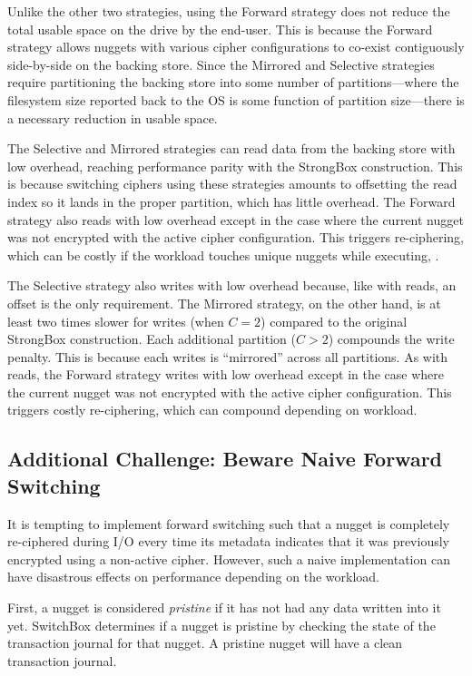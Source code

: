 Unlike the other two strategies, using the Forward strategy does not reduce the
total usable space on the drive by the end-user. This is because the Forward
strategy allows nuggets with various cipher configurations to co-exist
contiguously side-by-side on the backing store. Since the Mirrored and Selective
strategies require partitioning the backing store into some number of
partitions---where the filesystem size reported back to the OS is some function
of partition size---there is a necessary reduction in usable space.

The Selective and Mirrored strategies can read data from the backing store with
low overhead, reaching performance parity with the StrongBox construction. This
is because switching ciphers using these strategies amounts to offsetting the
read index so it lands in the proper partition, which has little overhead. The
Forward strategy also reads with low overhead except in the case where the
current nugget was not encrypted with the active cipher configuration. This
triggers re-ciphering, which can be costly if the workload touches unique
nuggets while executing, .

The Selective strategy also writes with low overhead because, like with reads,
an offset is the only requirement. The Mirrored strategy, on the other hand, is
at least two times slower for writes (when $C = 2$) compared to the original
StrongBox construction. Each additional partition ($C > 2$) compounds the write
penalty. This is because each writes is ``mirrored'' across all partitions. As
with reads, the Forward strategy writes with low overhead except in the case
where the current nugget was not encrypted with the active cipher configuration.
This triggers costly re-ciphering, which can compound depending on workload.

\subsection{Additional Challenge: Beware Naive Forward Switching}

It is tempting to implement forward switching such that a nugget is completely
re-ciphered during I/O every time its metadata indicates that it was previously
encrypted using a non-active cipher. However, such a naive implementation can
have disastrous effects on performance depending on the workload.

First, a nugget is considered \emph{pristine} if it has not had any data written
into it yet. SwitchBox determines if a nugget is pristine by checking the state
of the transaction journal for that nugget. A pristine nugget will have a clean
transaction journal.

